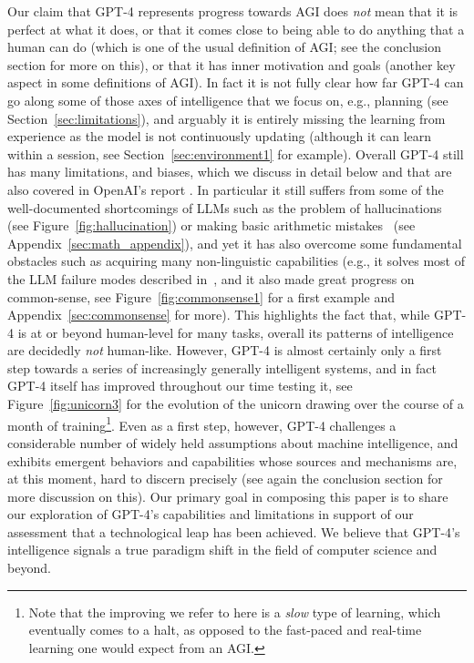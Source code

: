     Our claim that {GPT-4} represents progress towards AGI does {\em not} mean that it is perfect at what it does, or that it comes close to being able to do anything that a human can do (which is one of the usual definition of AGI; see the conclusion section for more on this), or that it has inner motivation and goals (another key aspect in some definitions of AGI). In fact it is not fully clear how far {GPT-4} can go along some of those axes of intelligence that we focus on, e.g., planning (see Section~\ref{sec:limitations}), and arguably it is entirely missing the learning from experience as the model is not continuously updating (although it can learn within a session, see Section~\ref{sec:environment1} for example). Overall {GPT-4} still has many limitations, and biases, which we discuss in detail below and that are also covered in OpenAI's report \cite{gpt4}. In particular it still suffers from some of the well-documented shortcomings of LLMs such as the problem of hallucinations~\cite{maynez2020faithfulness} (see Figure~\ref{fig:hallucination}) or making basic arithmetic mistakes~\cite{cobbe2021training} (see Appendix~\ref{sec:math_appendix}), and yet it has also overcome some fundamental obstacles such as acquiring many non-linguistic capabilities (e.g., it solves most of the LLM failure modes described in~\cite{mahowald2023dissociating}, and it also made great progress on common-sense, see Figure~\ref{fig:commonsense1} for a first example and Appendix~\ref{sec:commonsense} for more). This highlights the fact that, while {GPT-4} is at or beyond human-level for many tasks, overall its patterns of intelligence are decidedly {\em not} human-like. However, {GPT-4} is almost certainly only a first step towards a series of increasingly generally intelligent systems, and in fact {GPT-4} itself has improved throughout our time testing it, see Figure~\ref{fig:unicorn3} for the evolution of the unicorn drawing over the course of a month of training\footnote{Note that the improving we refer to here is a {\em slow} type of learning, which eventually comes to a halt, as opposed to the fast-paced and real-time learning one would expect from an AGI.}. Even as a first step, however, {GPT-4} challenges a considerable number of widely held assumptions about machine intelligence, and exhibits emergent behaviors and capabilities whose sources and mechanisms are, at this moment, hard to discern precisely (see again the conclusion section for more discussion on this). Our primary goal in composing this paper is to share our exploration of {GPT-4}'s capabilities and limitations in support of our assessment that a technological leap has been achieved. We believe that {GPT-4}'s intelligence signals a true paradigm shift in the field of computer science and beyond. 

